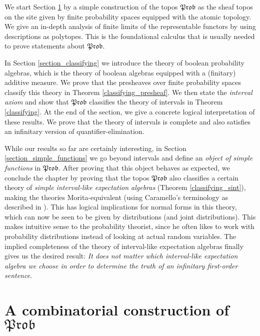 \documentclass[a4paper]{amsproc}
\theoremstyle{plain}
\theoremstyle{definition}
\theoremstyle{remark}
\numberwithin{equation}{section}
\newcommand{\Prob}{\mathfrak{Prob}}
\begin{document}

We start Section \ref{section_combinatorial} by a simple construction of the topos $\Prob$ as the sheaf topos on the site given by finite probability spaces equipped with the atomic topology. We give an in-depth analysis of finite limits of the representable functors by using descriptions as polytopes. This is the foundational calculus that is usually needed to prove statements about $\Prob$.

In Section \ref{section_classifying} we introduce the theory of boolean probability algebras, which is the theory of boolean algebras equipped with a (finitary) additive measure. We prove that the presheaves over finite probability spaces classify this theory in Theorem \ref{classifying_presheaf}. We then state the \emph{interval axiom} and show that $\Prob$ classifies the theory of intervals in Theorem \ref{classifying}. At the end of the section, we give a concrete logical interpretation of these results. We prove that the theory of intervals is complete and also satisfies an infinitary version of quantifier-elimination.

While our results so far are certainly interesting, in Section \ref{section_simple_functions} we go beyond intervals and define an \emph{object of simple functions} in $\Prob$. After proving that this object behaves as expected, we conclude the chapter by proving that the topos $\Prob$ also classifies a certain theory of \emph{simple interval-like expectation algebras} (Theorem \ref{classifying_sint}), making the theories Morita-equivalent (using Caramello's terminology as described in \cite{caramello2018theories}). This has logical implications for normal forms in this theory, which can now be seen to be given by distributions (and joint distributions). This makes intuitive sense to the probability theorist, since he often likes to work with probability distributions instead of looking at actual random variables. The implied completeness of the theory of interval-like expectation algebras finally gives us the desired result: \emph{It does not matter which interval-like expectation algebra we choose in order to determine the truth of an infinitary first-order sentence}.


\section{A combinatorial construction of $\Prob$}\label{section_combinatorial}
\end{document}
